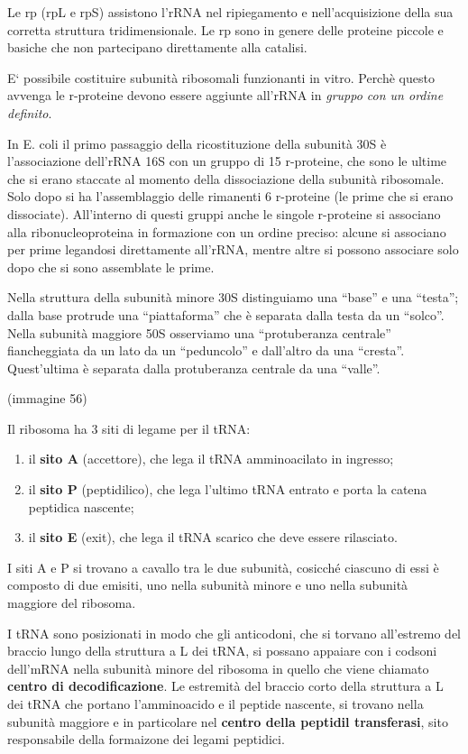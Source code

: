 \documentclass[11pt]{book}
\begin{document}
Le rp (rpL e rpS) assistono l'rRNA nel ripiegamento e nell'acquisizione
della sua corretta struttura tridimensionale. Le rp sono in genere delle
proteine piccole e basiche che non partecipano direttamente alla
catalisi.

E` possibile costituire subunità ribosomali funzionanti in vitro. Perchè
questo avvenga le r-proteine devono essere aggiunte all'rRNA in
\emph{gruppo con un ordine definito}.

In E. coli il primo passaggio della ricostituzione della subunità 30S è
l'associazione dell'rRNA 16S con un gruppo di 15 r-proteine, che sono le
ultime che si erano staccate al momento della dissociazione della
subunità ribosomale. Solo dopo si ha l'assemblaggio delle rimanenti 6
r-proteine (le prime che si erano dissociate). All'interno di questi
gruppi anche le singole r-proteine si associano alla ribonucleoproteina
in formazione con un ordine preciso: alcune si associano per prime
legandosi direttamente all'rRNA, mentre altre si possono associare solo
dopo che si sono assemblate le prime.

Nella struttura della subunità minore 30S distinguiamo una ``base'' e
una ``testa''; dalla base protrude una ``piattaforma'' che è separata
dalla testa da un ``solco''. Nella subunità maggiore 50S osserviamo una
``protuberanza centrale'' fiancheggiata da un lato da un ``peduncolo'' e
dall'altro da una ``cresta''. Quest'ultima è separata dalla protuberanza
centrale da una ``valle''.

(immagine 56)

Il ribosoma ha 3 siti di legame per il tRNA:

\begin{enumerate}
\def\labelenumi{\arabic{enumi}.}
\itemsep1pt\parskip0pt
\item
  il \textbf{sito A} (accettore), che lega il tRNA amminoacilato in
  ingresso;
\item
  il \textbf{sito P} (peptidilico), che lega l'ultimo tRNA entrato e
  porta la catena peptidica nascente;
\item
  il \textbf{sito E} (exit), che lega il tRNA scarico che deve essere
  rilasciato.
\end{enumerate}

I siti A e P si trovano a cavallo tra le due subunità, cosicché ciascuno
di essi è composto di due emisiti, uno nella subunità minore e uno nella
subunità maggiore del ribosoma.

I tRNA sono posizionati in modo che gli anticodoni, che si torvano
all'estremo del braccio lungo della struttura a L dei tRNA, si possano
appaiare con i codsoni dell'mRNA nella subunità minore del ribosoma in
quello che viene chiamato \textbf{centro di decodificazione}. Le
estremità del braccio corto della struttura a L dei tRNA che portano
l'amminoacido e il peptide nascente, si trovano nella subunità maggiore
e in particolare nel \textbf{centro della peptidil transferasi}, sito
responsabile della formaizone dei legami peptidici.
\end{document}

